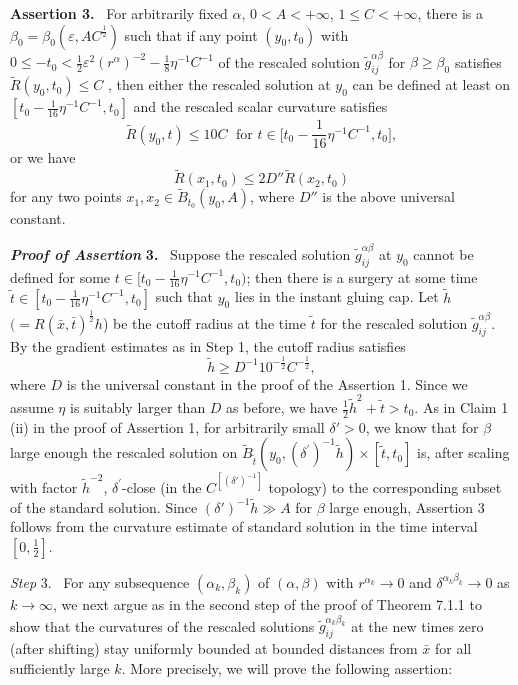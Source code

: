 \medskip
{\bf Assertion 3.} \ For arbitrarily fixed $\alpha$,
$0<A<+\infty$, $1 \leq C<+\infty$, there is a
$\beta_0=\beta_0(\varepsilon, AC^{\frac{1}{2}})$ such that if any
point $(y_0,t_0)$  with  $0 \leq -t_0 <\frac{1}{2}\varepsilon^2
(r^{\alpha})^{-2}- \frac{1}{8}\eta^{-1}C^{-1}$ of the rescaled
solution $\widetilde{g}^{\alpha\beta}_{ij}$ for $\beta\geq\beta_0$
satisfies $\widetilde{R}(y_0,t_0)\leq C$ , then either the
rescaled solution at $y_0$ can be defined at least on
$[t_0-\frac{1}{16}\eta^{-1}C^{-1},t_0]$ and the rescaled scalar
curvature satisfies
$$
\widetilde{R}(y_0,t)\leq 10 {C} \; \mbox{ for } t\in
\Big[t_0-\frac{1}{16}\eta^{-1}C^{-1},t_0\Big],
$$
or we have
$$
\widetilde{R}(x_1,t_0)\leq 2D'' \widetilde{R}(x_2,t_0)
$$
for any two points $x_1, x_2\in \widetilde{B}_{t_0}(y_0,A)$, where
$D''$ is the above universal constant.

\medskip
{\bf \em Proof of Assertion} {\bf 3.} \ Suppose the rescaled
solution $\widetilde{g}^{\alpha\beta}_{ij}$ at $y_0$ cannot be
defined for some $t\in [t_0-\frac{1}{16}\eta^{-1}C^{-1},t_0)$;
then there is a surgery at some time $\tilde{t} \in
[t_0-\frac{1}{16}\eta^{-1}C^{-1},t_0]$ such that $y_0 $ lies in
the instant gluing cap. Let $\tilde{h}$
$(=R(\bar{x},\bar{t})^{\frac{1}{2}}h$) be the cutoff radius at the
time $\tilde{t}$ for the rescaled solution
$\widetilde{g}^{\alpha\beta}_{ij}$.  By the gradient estimates as
in Step 1, the cutoff radius satisfies
$$
\tilde{h} \geq D^{-1}10^{-\frac{1}{2}}C^{-\frac{1}{2}},
$$
where $D$ is the universal constant in the proof of the Assertion
1. Since we assume $\eta$ is suitably larger than $D$ as before,
we have $\frac{1}{2}\tilde{h}^{2} +\tilde{t}>t_0$. As in Claim 1
(ii) in the proof of Assertion 1, for arbitrarily small
$\delta'>0$, we know that for $\beta$ large enough the rescaled
solution on
$\widetilde{B}_{\tilde{t}}(y_0,{(\delta^{\prime})}^{-1}\tilde{h})\times
[\tilde{t},t_0]$ is, after scaling with factor $\tilde{h}^{-2}$,
${\delta}^{\prime}$-close (in the $C^{[(\delta')^{-1}]}$ topology)
to the corresponding subset of the standard solution. Since
$(\delta')^{-1}\tilde{h}\gg A$ for $\beta$ large enough, Assertion
3 follows from the curvature estimate of standard solution in the
time interval $ [0,\frac{1}{2}]$.

\medskip
{\it Step} 3. \ For any subsequence $(\alpha_k,\beta_k)$ of
$(\alpha,\beta)$ with $r^{\alpha_k}\rightarrow 0$ and
$\delta^{\alpha_k\beta_k}\rightarrow 0$ as $k\rightarrow \infty$,
we next argue as in the second step of the proof of Theorem 7.1.1
to show that the curvatures of the rescaled solutions
$\tilde{g}^{\alpha_k\beta_k}_{ij}$ at the new times zero (after
shifting) stay uniformly bounded at bounded distances from
$\bar{x}$ for all sufficiently large $k$. More precisely, we will
prove the following assertion:

